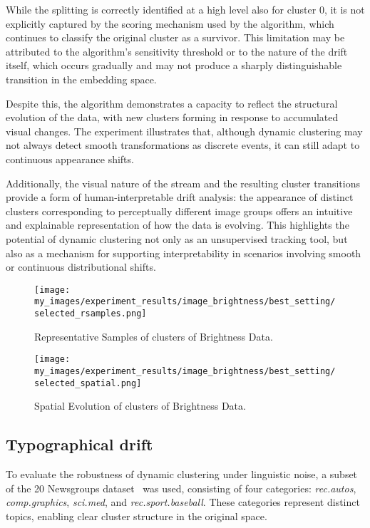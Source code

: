 While the splitting is correctly identified at a high level also for cluster 0,
it is not explicitly captured by the scoring mechanism used by the algorithm,
which continues to classify the original cluster as a survivor. This limitation
may be attributed to the algorithm's sensitivity threshold or to the nature of
the drift itself, which occurs gradually and may not produce a sharply
distinguishable transition in the embedding space.

Despite this, the algorithm demonstrates a capacity to reflect the structural
evolution of the data, with new clusters forming in response to accumulated
visual changes. The experiment illustrates that, although dynamic clustering
may not always detect smooth transformations as discrete events, it can still
adapt to continuous appearance shifts.

Additionally, the visual nature of the stream and the resulting cluster
transitions provide a form of human-interpretable drift analysis: the
appearance of distinct clusters corresponding to perceptually different image
groups offers an intuitive and explainable representation of how the data is
evolving. This highlights the potential of dynamic clustering not only as an
unsupervised tracking tool, but also as a mechanism for supporting
interpretability in scenarios involving smooth or continuous distributional
shifts.

\begin{figure}[H]
      \centering
      \texttt{[image: my\_images/experiment\_results/image\_brightness/best\_setting/selected\_rsamples.png]}
      \caption{Representative Samples of clusters of Brightness Data.}
\end{figure}

\begin{figure}[H]
      \centering
      \texttt{[image: my\_images/experiment\_results/image\_brightness/best\_setting/selected\_spatial.png]}
      \caption{Spatial Evolution of clusters of Brightness Data.}
\end{figure}

\subsection{Typographical drift}\label{subsec:typographical_drift}
To evaluate the robustness of dynamic clustering under linguistic noise, a
subset of the 20 Newsgroups dataset~\cite{20newsgroups} was used, consisting of
four categories: \emph{rec.autos}, \emph{comp.graphics}, \emph{sci.med}, and
\emph{rec.sport.baseball}. These categories represent distinct topics, enabling
clear cluster structure in the original space.


